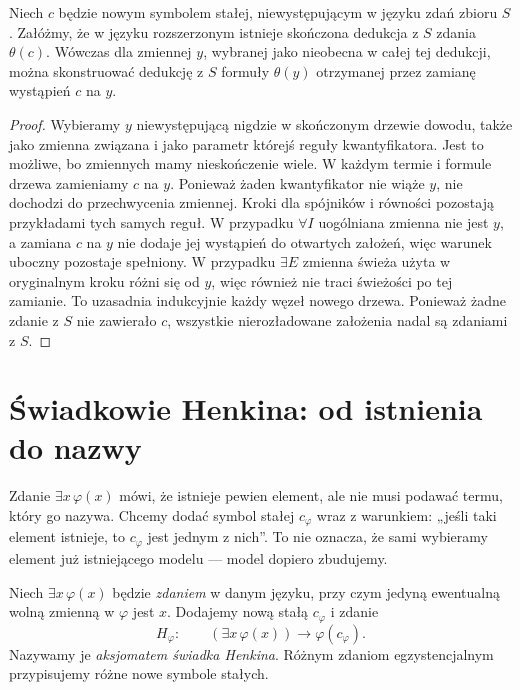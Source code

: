 \begin{lemat}\label{lem:henkin-constant-to-variable}
Niech $c$ będzie nowym symbolem stałej, niewystępującym w języku zdań zbioru $S$. Załóżmy, że w języku rozszerzonym istnieje skończona dedukcja z $S$ zdania $\theta(c)$. Wówczas dla zmiennej $y$, wybranej jako nieobecna w całej tej dedukcji, można skonstruować dedukcję z $S$ formuły $\theta(y)$ otrzymanej przez zamianę wystąpień $c$ na $y$.
\end{lemat}
\begin{proof}
Wybieramy $y$ niewystępującą nigdzie w skończonym drzewie dowodu, także jako zmienna związana i jako parametr którejś reguły kwantyfikatora. Jest to możliwe, bo zmiennych mamy nieskończenie wiele. W każdym termie i formule drzewa zamieniamy $c$ na $y$. Ponieważ żaden kwantyfikator nie wiąże $y$, nie dochodzi do przechwycenia zmiennej. Kroki dla spójników i równości pozostają przykładami tych samych reguł. W przypadku $\forall I$ uogólniana zmienna nie jest $y$, a zamiana $c$ na $y$ nie dodaje jej wystąpień do otwartych założeń, więc warunek uboczny pozostaje spełniony. W przypadku $\exists E$ zmienna świeża użyta w oryginalnym kroku różni się od $y$, więc również nie traci świeżości po tej zamianie. To uzasadnia indukcyjnie każdy węzeł nowego drzewa. Ponieważ żadne zdanie z $S$ nie zawierało $c$, wszystkie nierozładowane założenia nadal są zdaniami z $S$.
\end{proof}

\section{Świadkowie Henkina: od istnienia do nazwy}
Zdanie $\exists x\,\varphi(x)$ mówi, że istnieje pewien element, ale nie musi podawać termu, który go nazywa. Chcemy dodać symbol stałej $c_{\varphi}$ wraz z warunkiem: „jeśli taki element istnieje, to $c_{\varphi}$ jest jednym z nich”. To nie oznacza, że sami wybieramy element już istniejącego modelu --- model dopiero zbudujemy.

\begin{definicja}\label{def:henkin-witness-axiom}
Niech $\exists x\,\varphi(x)$ będzie \emph{zdaniem} w danym języku, przy czym jedyną ewentualną wolną zmienną w $\varphi$ jest $x$. Dodajemy nową stałą $c_{\varphi}$ i zdanie
\[
H_{\varphi}:\qquad (\exists x\,\varphi(x))\to\varphi(c_{\varphi}).
\]
Nazywamy je \emph{aksjomatem świadka Henkina}. Różnym zdaniom egzystencjalnym przypisujemy różne nowe symbole stałych.
\end{definicja}

